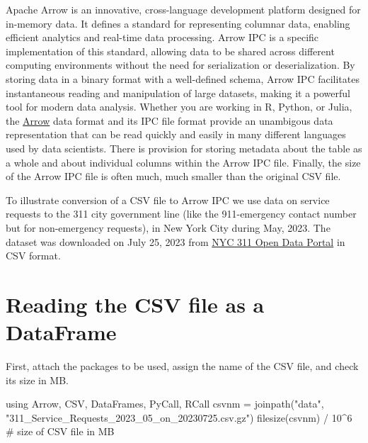 \documentclass[
  12pt]{article}
\newenvironment{Shaded}{\begin{snugshade}}{\end{snugshade}}
\newcommand{\BuiltInTok}[1]{\textcolor[rgb]{0.00,0.23,0.31}{#1}}
\newcommand{\CommentTok}[1]{\textcolor[rgb]{0.37,0.37,0.37}{#1}}
\newcommand{\FloatTok}[1]{\textcolor[rgb]{0.68,0.00,0.00}{#1}}
\newcommand{\FunctionTok}[1]{\textcolor[rgb]{0.28,0.35,0.67}{#1}}
\newcommand{\ImportTok}[1]{\textcolor[rgb]{0.00,0.46,0.62}{#1}}
\newcommand{\NormalTok}[1]{\textcolor[rgb]{0.00,0.23,0.31}{#1}}
\newcommand{\OperatorTok}[1]{\textcolor[rgb]{0.37,0.37,0.37}{#1}}
\newcommand{\StringTok}[1]{\textcolor[rgb]{0.13,0.47,0.30}{#1}}
\begin{document}
Apache Arrow is an innovative, cross-language development platform
designed for in-memory data. It defines a standard for representing
columnar data, enabling efficient analytics and real-time data
processing. Arrow IPC is a specific implementation of this standard,
allowing data to be shared across different computing environments
without the need for serialization or deserialization. By storing data
in a binary format with a well-defined schema, Arrow IPC facilitates
instantaneous reading and manipulation of large datasets, making it a
powerful tool for modern data analysis. Whether you are working in R,
Python, or Julia, the \href{https://arrow.apache.org}{Arrow} data format
and its IPC file format provide an unambigous data representation that
can be read quickly and easily in many different languages used by data
scientists. There is provision for storing metadata about the table as a
whole and about individual columns within the Arrow IPC file. Finally,
the size of the Arrow IPC file is often much, much smaller than the
original CSV file.

To illustrate conversion of a CSV file to Arrow IPC we use data on
service requests to the 311 city government line (like the 911-emergency
contact number but for non-emergency requests), in New York City during
May, 2023. The dataset was downloaded on July 25, 2023 from
\href{https://data.cityofnewyork.us/Social-Services/NYC-311-Data/jrb2-thup}{NYC
311 Open Data Portal} in CSV format.

\section{Reading the CSV file as a DataFrame}\label{sec-reading}

First, attach the packages to be used, assign the name of the CSV file,
and check its size in MB.

\begin{Shaded}
\begin{Highlighting}[]
\ImportTok{using} \BuiltInTok{Arrow}\NormalTok{, }\BuiltInTok{CSV}\NormalTok{, }\BuiltInTok{DataFrames}\NormalTok{, }\BuiltInTok{PyCall}\NormalTok{, }\BuiltInTok{RCall}
\NormalTok{csvnm }\OperatorTok{=} \FunctionTok{joinpath}\NormalTok{(}\StringTok{"data"}\NormalTok{, }\StringTok{"311\_Service\_Requests\_2023\_05\_on\_20230725.csv.gz"}\NormalTok{)}
\FunctionTok{filesize}\NormalTok{(csvnm) }\OperatorTok{/} \FloatTok{10}\OperatorTok{\^{}}\FloatTok{6}     \CommentTok{\# size of CSV file in MB}
\end{Highlighting}
\end{Shaded}
\end{document}
